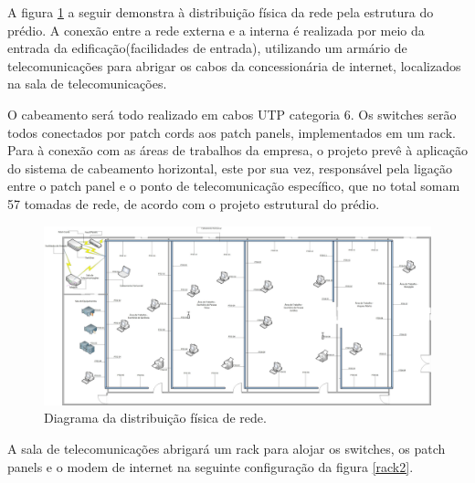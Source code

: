 \documentclass[	DIV=calc,%
							paper=a4,%
							fontsize=12pt,%
							onecolumn]{scrartcl}	 					%
\begin{document}
A figura \ref{desenho1} a seguir demonstra à distribuição física da rede pela estrutura do prédio. A conexão entre a rede externa e a interna é realizada por meio da entrada da edificação(facilidades de entrada), utilizando um armário de telecomunicações para abrigar os cabos da concessionária de internet, localizados na  sala de telecomunicações.

O cabeamento será todo realizado em cabos UTP categoria 6. Os switches serão todos conectados por patch cords aos patch panels, implementados em um rack. Para à conexão com as áreas de trabalhos da empresa, o projeto prevê à aplicação do sistema de cabeamento horizontal, este por sua vez, responsável pela ligação entre o patch panel e o ponto de telecomunicação específico, que no total somam 57 tomadas de rede, de acordo com o projeto estrutural do prédio.

\begin{figure}[h]
	\centering
	\includegraphics[scale=0.22]{desenho1}
	\caption{Diagrama da distribuição física de rede.}
	\label{desenho1}
\end{figure}

\newpage
A sala de telecomunicações abrigará um rack para alojar os switches, os patch panels e o modem de internet na seguinte configuração da figura \ref{rack2}.
\end{document}
